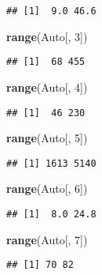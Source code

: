 \documentclass[
]{article}
\newenvironment{Shaded}{\begin{snugshade}}{\end{snugshade}}
\newcommand{\DecValTok}[1]{\textcolor[rgb]{0.00,0.00,0.81}{#1}}
\newcommand{\FunctionTok}[1]{\textcolor[rgb]{0.13,0.29,0.53}{\textbf{#1}}}
\newcommand{\NormalTok}[1]{#1}
\begin{document}
\begin{verbatim}
## [1]  9.0 46.6
\end{verbatim}

\begin{Shaded}
\begin{Highlighting}[]
\FunctionTok{range}\NormalTok{(Auto[, }\DecValTok{3}\NormalTok{])}
\end{Highlighting}
\end{Shaded}

\begin{verbatim}
## [1]  68 455
\end{verbatim}

\begin{Shaded}
\begin{Highlighting}[]
\FunctionTok{range}\NormalTok{(Auto[, }\DecValTok{4}\NormalTok{])}
\end{Highlighting}
\end{Shaded}

\begin{verbatim}
## [1]  46 230
\end{verbatim}

\begin{Shaded}
\begin{Highlighting}[]
\FunctionTok{range}\NormalTok{(Auto[, }\DecValTok{5}\NormalTok{])}
\end{Highlighting}
\end{Shaded}

\begin{verbatim}
## [1] 1613 5140
\end{verbatim}

\begin{Shaded}
\begin{Highlighting}[]
\FunctionTok{range}\NormalTok{(Auto[, }\DecValTok{6}\NormalTok{])}
\end{Highlighting}
\end{Shaded}

\begin{verbatim}
## [1]  8.0 24.8
\end{verbatim}

\begin{Shaded}
\begin{Highlighting}[]
\FunctionTok{range}\NormalTok{(Auto[, }\DecValTok{7}\NormalTok{])}
\end{Highlighting}
\end{Shaded}

\begin{verbatim}
## [1] 70 82
\end{verbatim}
\end{document}
